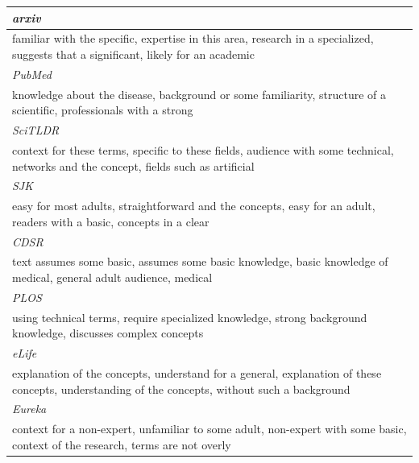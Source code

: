 \begin{table}[!h]
\centering \footnotesize
\begin{tabular}{p{}}

\vspace{-1mm}\textit{arxiv} \\ \hline
familiar with the specific, expertise in this area, research in a specialized, suggests that a significant, likely for an academic \\ 

\vspace{-1mm}\textit{PubMed} \\ \hline
knowledge about the disease, background or some familiarity, structure of a scientific,  professionals with a strong \\ 

\vspace{-1mm}\textit{SciTLDR}\\ \hline
context for these terms, specific to these fields, audience with some technical, networks and the concept, fields such as artificial
 \\ 

\vspace{-1mm}\textit{SJK} \\ \hline
easy for most adults, straightforward and the concepts, easy for an adult, readers with a basic, concepts in a clear \\ 

\vspace{-1mm}\textit{CDSR}\\\hline
 text assumes some basic, assumes some basic knowledge, basic knowledge of medical, general adult audience, medical
\\ 

\vspace{-1mm}\textit{PLOS}\\ \hline
using technical terms, require specialized knowledge, strong background knowledge, discusses complex concepts
 \\ 

\vspace{-1mm}\textit{eLife} \\ \hline
explanation of the concepts, understand for a general, explanation of these concepts, understanding of the concepts, without such a background
\\ 

\vspace{-1mm}\textit{Eureka} \\ \hline
context for a non-expert, unfamiliar to some adult, non-expert with some basic, context of the research, terms are not overly
\\ 


\end{tabular}
\end{table}
